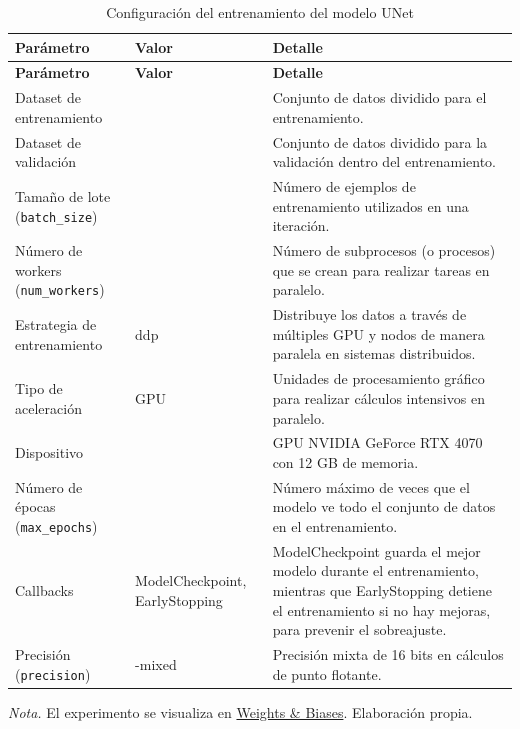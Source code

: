 \begin{longtable}{>{\raggedright\arraybackslash}p{5cm}>{\raggedright\arraybackslash}p{3cm}>{\raggedright\arraybackslash}p{7cm}}
    \caption{Configuración del entrenamiento del modelo UNet}  \label{tab:config_train_unet} \\
    \hline
    \textbf{Parámetro} & \textbf{Valor} & \textbf{Detalle} \\
    \hline
    \endfirsthead
    \hline
    \textbf{Parámetro} & \textbf{Valor} & \textbf{Detalle} \\
    \hline
    \endhead
    \hline
    \endfoot
    \hline
    \endlastfoot
    Dataset de entrenamiento & 675 & Conjunto de datos dividido para el entrenamiento. \\
    Dataset de validación & 168 & Conjunto de datos dividido para la validación dentro del entrenamiento. \\    
    Tamaño de lote (\texttt{batch\_size}) & 16 & Número de ejemplos de entrenamiento utilizados en una iteración. \\
    Número de workers (\texttt{num\_workers}) & 16 & Número de subprocesos (o procesos) que se crean para realizar tareas en paralelo. \\
    Estrategia de entrenamiento & ddp & Distribuye los datos a través de múltiples GPU y nodos de manera paralela en sistemas distribuidos. \\
    Tipo de aceleración & GPU & Unidades de procesamiento gráfico para realizar cálculos intensivos en paralelo. \\
    Dispositivo & 0 & GPU NVIDIA GeForce RTX 4070 con 12 GB de memoria. \\
    Número de épocas (\texttt{max\_epochs}) & 50 & Número máximo de veces que el modelo ve todo el conjunto de datos en el entrenamiento. \\
    Callbacks & ModelCheckpoint, EarlyStopping & ModelCheckpoint guarda el mejor modelo durante el entrenamiento, mientras que EarlyStopping detiene el 
    entrenamiento si no hay mejoras, para prevenir el sobreajuste. \\
    Precisión (\texttt{precision}) & 16-mixed & Precisión mixta de 16 bits en cálculos de punto flotante. \\        
    \hline
\end{longtable}
\begin{flushleft}
    \vspace{-\baselineskip}
    \textit{Nota.} El experimento se visualiza en \href{https://wandb.ai/scigeo/scburning/runs/3nfebv59}{Weights \& Biases}. Elaboración propia.     
\end{flushleft}

